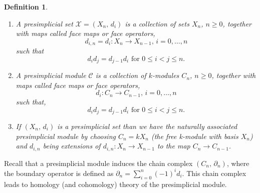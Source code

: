 \documentclass[12pt]{amsart}
\newtheorem{definition}[theorem]{Definition}
\begin{document}
\begin{definition}\cite{E-Z,Lod,Prz8}\label{Presimplicial module}
\begin{enumerate}
\item[(1)]  A presimplicial set $\mathcal X = (X_n,\,d_i)$  is a collection of sets $X_{n}$, $n \geq 0$, together with maps called face maps or face operators,
\begin{equation*}
d_{i,n}=d_{i}: X_{n} \to X_{n-1},\,i=0,\ldots,n
\end{equation*}
such that
\begin{equation*}
d_{i}d_{j} = d_{j-1}d_{i} \mbox{ for } 0 \leq i<j \leq n.
\end{equation*}
\item[(2)] A presimplicial module $\mathcal C$ is a collection of $k$-modules $C_{n}$, $n \geq 0$, together with maps called face maps or face operators,
\begin{equation*}
d_{i}: C_{n} \to C_{n-1},\,i=0,\ldots,n   
\end{equation*}
such that,
\begin{equation*}
d_{i}d_{j} = d_{j-1}d_{i} \mbox{ for } 0 \leq i<j \leq n.
\end{equation*}
\item[(3)] If $(X_n,\,d_i)$ is a presimplicial set than we have the naturally associated presimplicial module by choosing $C_n=kX_n$ (the free
k-module with basis $X_n$) and $d_{i,n}$ being extensions of $d_{i,n}: X_n \to X_{n-1}$ to the map $C_n\to C_{n-1}$.
\end{enumerate}
\end{definition}
Recall that a presimplicial module induces the chain complex $(C_n,\,\partial_n)$, where the boundary operator is defined as $\partial_n=\sum_{i=0}^n(-1)^id_i$. This chain complex leads to homology (and cohomology) theory of the presimplicial module.
\end{document}
